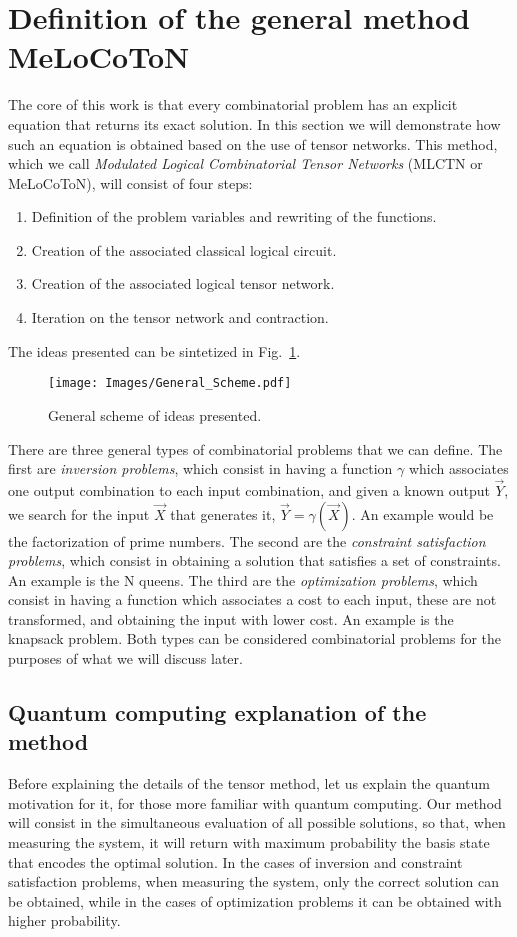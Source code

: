 \section{Definition of the general method MeLoCoToN}
The core of this work is that every combinatorial problem has an explicit equation that returns its exact solution. In this section we will demonstrate how such an equation is obtained based on the use of tensor networks. This method, which we call \textit{Modulated Logical Combinatorial Tensor Networks} (MLCTN or MeLoCoToN), will consist of four steps:
\begin{enumerate}
    \item Definition of the problem variables and rewriting of the functions.
    \item Creation of the associated classical logical circuit.
    \item Creation of the associated logical tensor network.
    \item Iteration on the tensor network and contraction.
\end{enumerate}

The ideas presented can be sintetized in Fig.~\ref{fig: General Scheme}.

\begin{figure}[h]
    \centering
    \texttt{[image: Images/General\_Scheme.pdf]}
    \caption{General scheme of ideas presented.}
    \label{fig: General Scheme}
\end{figure}

There are three general types of combinatorial problems that we can define. The first are \textit{inversion problems}, which consist in having a function $\gamma$ which associates one output combination to each input combination, and given a known output $\vec{Y}$, we search for the input $\vec{X}$ that generates it, $\vec{Y}=\gamma(\vec{X})$. An example would be the factorization of prime numbers. The second are the \textit{constraint satisfaction problems}, which consist in obtaining a solution that satisfies a set of constraints. An example is the N queens. The third are the \textit{optimization problems}, which consist in having a function which associates a cost to each input, these are not transformed, and obtaining the input with lower cost. An example is the knapsack problem. Both types can be considered combinatorial problems for the purposes of what we will discuss later.

\subsection{Quantum computing explanation of the method}
Before explaining the details of the tensor method, let us explain the quantum motivation for it, for those more familiar with quantum computing. Our method will consist in the simultaneous evaluation of all possible solutions, so that, when measuring the system, it will return with maximum probability the basis state that encodes the optimal solution. In the cases of inversion and constraint satisfaction problems, when measuring the system, only the correct solution can be obtained, while in the cases of optimization problems it can be obtained with higher probability.


